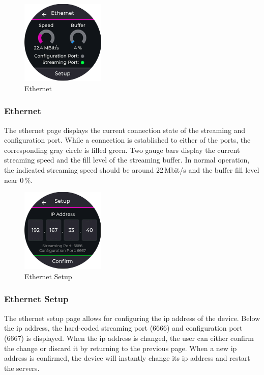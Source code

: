\begin{minipage}{\linewidth}
	\begin{figure}
		\vspace{-0.6cm}
		\includegraphics[width=4cm]{images/6_design_final/gui/04_ethernet.png}
		\centering
		\caption{Ethernet}
		\label{fig:final_design_gui_ethernet}
	\end{figure}
	\subsubsection{Ethernet}
	The ethernet page displays the current connection state of the streaming and configuration port.
	While a connection is established to either of the ports, the corresponding gray circle is filled green.
	Two gauge bars display the current streaming speed and the fill level of the streaming buffer.
	In normal operation, the indicated streaming speed should be around 22\,Mbit/s and the buffer fill level near 0\,\%.
\end{minipage}
\vspace{0.0cm}

\begin{minipage}{\linewidth}
	\begin{figure}
		\vspace{-0.6cm}
		\includegraphics[width=4cm]{images/6_design_final/gui/05_ethernet_config.png}
		\centering
		\caption{Ethernet Setup}
		\label{fig:final_design_gui_ethernet_setup}
	\end{figure}
	\subsubsection{Ethernet Setup}
	The ethernet setup page allows for configuring the \acrshort{ip} address  of the device.
	Below the \acrshort{ip} address, the hard-coded streaming port (6666) and configuration port (6667) is displayed.
	When the \acrshort{ip} address is changed, the user can either confirm the change or discard it by returning to the previous page.
	When a new \acrshort{ip} address is confirmed, the device will instantly change its \acrshort{ip} address and restart the servers.
\end{minipage}
\vspace{0.0cm}

